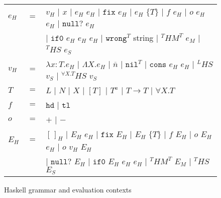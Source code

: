 \begin{figure}[p]
\centering
\begin{tabular}{lcl}
\vspace{5pt}

$e_{H}$ & $=$ & $v_{H}$ $\vert$ $x$ $\vert$ $e_{H}$ $e_{H}$ $\vert$ $\mathtt{fix}$ $e_{H}$ $\vert$ $e_{H}$ $\lbrace T\rbrace$ $\vert$ $f$ $e_{H}$ $\vert$ $o$ $e_{H}$ $e_{H}$ $\vert$ $\mathtt{null?}$ $e_{H}$ \\

\vspace{5pt}

&& $\vert$ $\mathtt{if0}$ $e_{H}$ $e_{H}$ $e_{H}$ $\vert$ $\mathtt{wrong}^{T}$ string $\vert$ $^{T}HM^{T}$ $e_{M}$ $\vert$ $^{T}HS$ $e_{S}$ \\

\vspace{5pt}

$v_{H}$ & $=$ & $\lambda x:T.e_{H}$ $\vert$ $\Lambda X.e_{H}$ $\vert$ $\overline{n}$ $\vert$ $\mathtt{nil}^{T}$ $\vert$ $\mathtt{cons}$ $e_{H}$ $e_{H}$ $\vert$ $^{L}HS$ $v_{S}$ $\vert$ $^{\forall X.T}HS$ $v_{S}$ \\

\vspace{5pt}

$T$ & $=$ & $L$ $\vert$ $N$ $\vert$ $X$ $\vert$ $[T]$ $\vert$ $T^{a}$ $\vert$ $T\rightarrow T$ $\vert$ $\forall X.T$ \\

\vspace{5pt}

$f$ & $=$ & $\mathtt{hd}$ $\vert$ $\mathtt{tl}$ \\

\vspace{5pt}

$o$ & $=$ & $+$ $\vert$ $-$ \\

\vspace{5pt}

$E_{H}$ & $=$ & $[\,]_{H}$ $\vert$ $E_{H}$ $e_{H}$ $\vert$ $\mathtt{fix}$ $E_{H}$ $\vert$ $E_{H}$ $\lbrace T\rbrace$ $\vert$ $f$ $E_{H}$ $\vert$ $o$ $E_{H}$ $e_{H}$ $\vert$ $o$ $v_{H}$ $E_{H}$ \\

\vspace{5pt}

&& $\vert$ $\mathtt{null?}$ $E_{H}$ $\vert$ $\mathtt{if0}$ $E_{H}$ $e_{H}$ $e_{H}$ $\vert$ $^{T}HM^{T}$ $E_{M}$ $\vert$ $^{T}HS$ $E_{S}$
\end{tabular}
\caption{Haskell grammar and evaluation contexts}
\label{hg}
\end{figure}